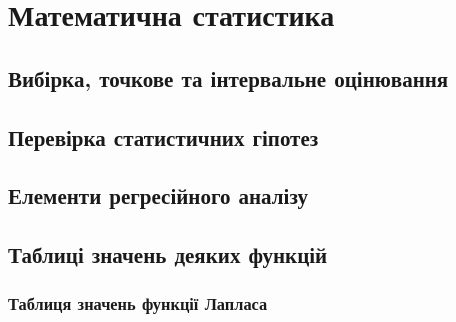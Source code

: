 \documentclass{report}
\begin{document}
    \part{Математична статистика}
    \chapter{Вибірка, точкове та інтервальне оцінювання}
        
        
        
    \chapter{Перевірка статистичних гіпотез}
        
        
        
    \chapter{Елементи регресійного аналізу}
        
        
    \chapter*{Таблиці значень деяких функцій}
    \section*{Таблиця значень функції Лапласа}\label{table:laplace}
        \newpage
\end{document}

